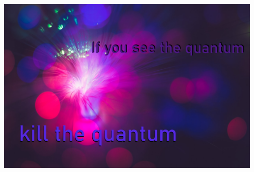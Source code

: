 \documentclass{book}
\begin{document}
	\newpage
	\raggedright
	\includegraphics[height=30cm]{images/koan3.png}
\end{document}
